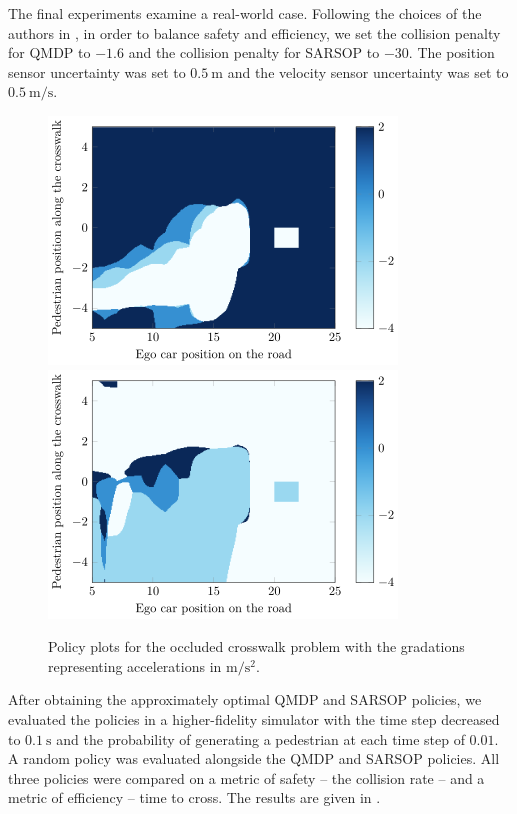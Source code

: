 \documentclass[conference]{IEEEtran}
\begin{document}
The final experiments examine a real-world case. Following the choices of the authors in \cite{Bouton2018ScalableDriving}, in order to balance safety and efficiency, we set the collision penalty for QMDP to $-1.6$ and the collision penalty for SARSOP to $-30$. The position sensor uncertainty was set to $0.5 ~\si{\meter}$ and the velocity sensor uncertainty was set to $0.5 ~\si{\meter\per\second}$.

\begin{figure}[tbph]
    \centerline{
        \includegraphics[width=0.5\linewidth]{src/plots/qmdpSIM_0_00001_noise_05.png}
        \includegraphics[width=0.5\linewidth]{src/plots/sarsopSIM_0_01_1000_noise_05.png}
    }
    \caption{Policy plots for the occluded crosswalk problem with the gradations representing accelerations in $\si{\meter\per\square\second}$. }
    \label{fig:qmdp_sarsop_1}
\end{figure}

After obtaining the approximately optimal QMDP and SARSOP policies, we evaluated the policies in a higher-fidelity simulator with the time step decreased to $0.1 ~\si{\second}$ and the probability of generating a pedestrian at each time step of $0.01$. A random policy was evaluated alongside the QMDP and SARSOP policies. All three policies were compared on a metric of safety -- the collision rate -- and a metric of efficiency -- time to cross. The results are given in .
\end{document}

